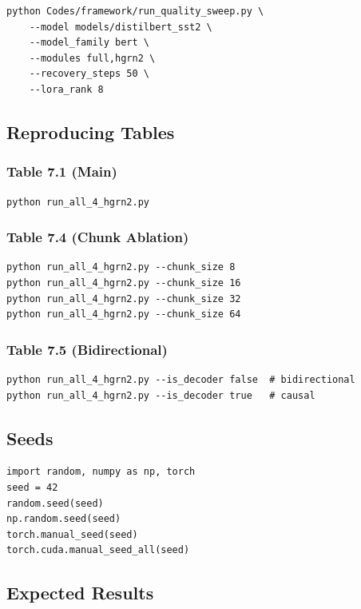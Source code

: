 \begin{lstlisting}
python Codes/framework/run_quality_sweep.py \
    --model models/distilbert_sst2 \
    --model_family bert \
    --modules full,hgrn2 \
    --recovery_steps 50 \
    --lora_rank 8
\end{lstlisting}

\subsection{Reproducing Tables}

\subsubsection{Table 7.1 (Main)}
\begin{lstlisting}
python run_all_4_hgrn2.py
\end{lstlisting}

\subsubsection{Table 7.4 (Chunk Ablation)}
\begin{lstlisting}
python run_all_4_hgrn2.py --chunk_size 8
python run_all_4_hgrn2.py --chunk_size 16
python run_all_4_hgrn2.py --chunk_size 32
python run_all_4_hgrn2.py --chunk_size 64
\end{lstlisting}

\subsubsection{Table 7.5 (Bidirectional)}
\begin{lstlisting}
python run_all_4_hgrn2.py --is_decoder false  # bidirectional
python run_all_4_hgrn2.py --is_decoder true   # causal
\end{lstlisting}

\subsection{Seeds}

\begin{lstlisting}
import random, numpy as np, torch
seed = 42
random.seed(seed)
np.random.seed(seed)
torch.manual_seed(seed)
torch.cuda.manual_seed_all(seed)
\end{lstlisting}

\subsection{Expected Results}

